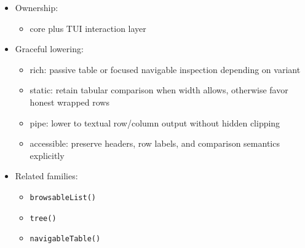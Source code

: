 \begin{itemize}
\begin{itemize}
  \item
    if rows wrap so heavily that column comparison is no longer readable, the table should usually collapse to a summary row plus a focused drill-down region instead of pretending dense comparison still works
  \item
    choose \texttt{n\allowbreak{}a\allowbreak{}v\allowbreak{}i\allowbreak{}g\allowbreak{}a\allowbreak{}b\allowbreak{}l\allowbreak{}e\allowbreak{}T\allowbreak{}a\allowbreak{}b\allowbreak{}l\allowbreak{}e\allowbreak{}(\allowbreak{})} / \texttt{n\allowbreak{}a\allowbreak{}v\allowbreak{}i\allowbreak{}g\allowbreak{}a\allowbreak{}b\allowbreak{}l\allowbreak{}e\allowbreak{}T\allowbreak{}a\allowbreak{}b\allowbreak{}l\allowbreak{}e\allowbreak{}S\allowbreak{}u\allowbreak{}r\allowbreak{}f\allowbreak{}a\allowbreak{}c\allowbreak{}e\allowbreak{}(\allowbreak{})} only when keyboard traversal is actually part of the job; otherwise keep the table passive
  \end{itemize}
\item
  Ownership:

  \begin{itemize}
  \tightlist
  \item
    core plus TUI interaction layer
  \end{itemize}
\item
  Graceful lowering:

  \begin{itemize}
  \tightlist
  \item
    rich: passive table or focused navigable inspection depending on variant
  \item
    static: retain tabular comparison when width allows, otherwise favor honest wrapped rows
  \item
    pipe: lower to textual row/column output without hidden clipping
  \item
    accessible: preserve headers, row labels, and comparison semantics explicitly
  \end{itemize}
\item
  Related families:

  \begin{itemize}
  \tightlist
  \item
    \texttt{b\allowbreak{}r\allowbreak{}o\allowbreak{}w\allowbreak{}s\allowbreak{}a\allowbreak{}b\allowbreak{}l\allowbreak{}e\allowbreak{}L\allowbreak{}i\allowbreak{}s\allowbreak{}t\allowbreak{}(\allowbreak{})}
  \item
    \texttt{t\allowbreak{}r\allowbreak{}e\allowbreak{}e\allowbreak{}(\allowbreak{})}
  \item
    \texttt{n\allowbreak{}a\allowbreak{}v\allowbreak{}i\allowbreak{}g\allowbreak{}a\allowbreak{}b\allowbreak{}l\allowbreak{}e\allowbreak{}T\allowbreak{}a\allowbreak{}b\allowbreak{}l\allowbreak{}e\allowbreak{}(\allowbreak{})}
  \end{itemize}
\end{itemize}

